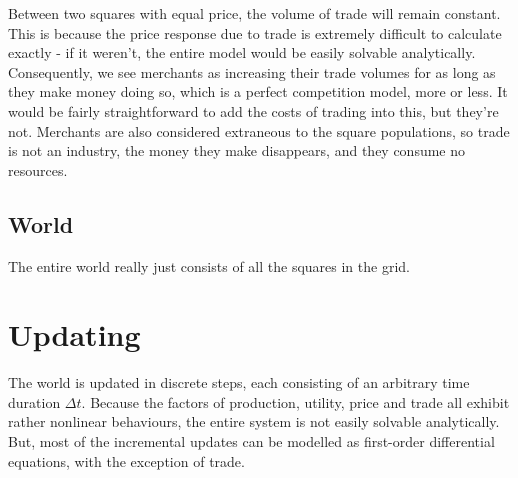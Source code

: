 \documentclass[12pt]{article}
\begin{document}
		Between two squares with equal price, the volume of trade will remain constant.
		This is because the price response due to trade is extremely difficult to calculate exactly - if it weren't, the entire model would be easily solvable analytically.
		Consequently, we see merchants as increasing their trade volumes for as long as they make money doing so, which is a perfect competition model, more or less.
		It would be fairly straightforward to add the costs of trading into this, but they're not. 
		Merchants are also considered extraneous to the square populations, so trade is not an industry, the money they make disappears, and they consume no resources.

		\subsection{World}
		The entire world really just consists of all the squares in the grid.
	
	\section{Updating}
	The world is updated in discrete steps, each consisting of an arbitrary time duration $\Delta t$. Because the factors of production, utility, price and trade all exhibit rather nonlinear behaviours, the entire system is not easily solvable analytically. But, most of the incremental updates can be modelled as first-order differential equations, with the exception of trade. 
	
	
	
	
\end{document}
